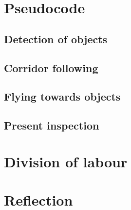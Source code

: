 \documentclass[a4paper,10pt]{article}
\begin{document}
\section{Pseudocode}

\subsection{Detection of objects}

\subsection{Corridor following} 

\subsection{Flying towards objects}

\subsection{Present inspection}

\section{Division of labour}
 
 

\section{Reflection}













\end{document}
